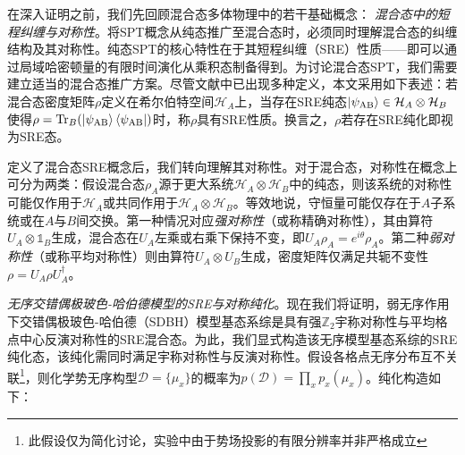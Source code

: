 \documentclass[preprint,superscriptaddress,floatfix, nofootinbib]{revtex4-2}
\begin{document}
\begin{CJK*}{UTF8}{gbsn}
在深入证明之前，我们先回顾混合态多体物理中的若干基础概念：
\textit{混合态中的短程纠缠与对称性}。将SPT概念从纯态推广至混合态时，必须同时理解混合态的纠缠结构及其对称性。纯态SPT的核心特性在于其短程纠缠（SRE）性质——即可以通过局域哈密顿量的有限时间演化从乘积态制备得到。为讨论混合态SPT，我们需要建立适当的混合态推广方案。尽管文献中已出现多种定义\cite{Ma2023, Chen2024}，本文采用如下表述：若混合态密度矩阵$\rho$定义在希尔伯特空间$\mathcal{H}_A$上，当存在SRE纯态$\ket{\psi_{\text{AB}}} \in \mathcal{H}_A \otimes \mathcal{H}_B$使得$\rho = \text{Tr}_{B}(\ket{\psi_{\text{AB}}} \bra{\psi_{\text{AB}}})$时，称$\rho$具有SRE性质。换言之，$\rho$若存在SRE纯化即视为SRE态。

定义了混合态SRE概念后，我们转向理解其对称性。对于混合态，对称性在概念上可分为两类：假设混合态$\rho_A$源于更大系统$\mathcal{H}_{A} \otimes \mathcal{H}_{B}$中的纯态，则该系统的对称性可能仅作用于$\mathcal{H}_A$或共同作用于$\mathcal{H}_A \otimes \mathcal{H}_B$。等效地说，守恒量可能仅存在于$A$子系统或在$A$与$B$间交换。第一种情况对应\textit{强对称性}（或称精确对称性），其由算符$U_A \otimes \mathds{1}_{B}$生成，混合态在$U_A$左乘或右乘下保持不变，即$U_A \rho_A = e^{i \theta} \rho_A$。第二种\textit{弱对称性}（或称平均对称性）则由算符$U_A \otimes U_B$生成，密度矩阵仅满足共轭不变性$\rho = U_A \rho U_A^{\dagger}$。

\textit{无序交错偶极玻色-哈伯德模型的SRE与对称纯化}。现在我们将证明，弱无序作用下交错偶极玻色-哈伯德（SDBH）模型基态系综是具有强$\mathbb{Z}_2$宇称对称性与平均格点中心反演对称性的SRE混合态。为此，我们显式构造该无序模型基态系综的SRE纯化态，该纯化需同时满足宇称对称性与反演对称性。假设各格点无序分布互不关联\footnote{此假设仅为简化讨论，实验中由于势场投影的有限分辨率并非严格成立}，则化学势无序构型$\mathcal{D} = \{\mu_x\}$的概率为$p(\mathcal{D}) = \prod_{x} p_x(\mu_x)$。纯化构造如下：


\end{CJK*}
\end{document}
